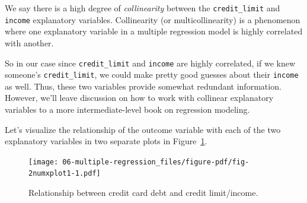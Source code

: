 \documentclass[
  letterpaper,
  DIV=11,
  numbers=noendperiod]{scrreprt}
\newenvironment{Shaded}{\begin{snugshade}}{\end{snugshade}}
\newcommand{\AttributeTok}[1]{\textcolor[rgb]{0.40,0.45,0.13}{#1}}
\newcommand{\ConstantTok}[1]{\textcolor[rgb]{0.56,0.35,0.01}{#1}}
\newcommand{\FunctionTok}[1]{\textcolor[rgb]{0.28,0.35,0.67}{#1}}
\newcommand{\NormalTok}[1]{\textcolor[rgb]{0.00,0.23,0.31}{#1}}
\newcommand{\SpecialCharTok}[1]{\textcolor[rgb]{0.37,0.37,0.37}{#1}}
\newcommand{\StringTok}[1]{\textcolor[rgb]{0.13,0.47,0.30}{#1}}
\theoremstyle{definition}
\theoremstyle{remark}
\begin{document}
We say there is a high degree of \emph{collinearity}
between the \texttt{credit\_limit} and \texttt{income} explanatory
variables. Collinearity (or multicollinearity) is a phenomenon where one
explanatory variable in a multiple regression model is highly correlated
with another.

So in our case since \texttt{credit\_limit} and \texttt{income} are
highly correlated, if we knew someone's \texttt{credit\_limit}, we could
make pretty good guesses about their \texttt{income} as well. Thus,
these two variables provide somewhat redundant information. However,
we'll leave discussion on how to work with collinear explanatory
variables to a more intermediate-level book on regression modeling.

Let's visualize the relationship of the outcome variable with each of
the two explanatory variables in two separate plots in
Figure~\ref{fig-2numxplot1}.

\begin{Shaded}
\end{Shaded}

\begin{figure}

{\centering \texttt{[image: 06-multiple-regression\_files/figure-pdf/fig-2numxplot1-1.pdf]}

}

\caption{\label{fig-2numxplot1}Relationship between credit card debt and
credit limit/income.}

\end{figure}
\end{document}
